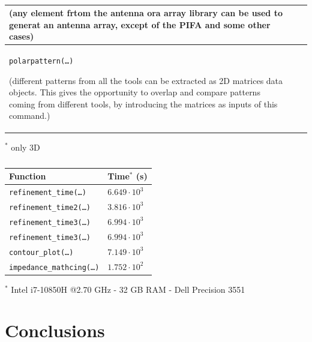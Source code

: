 \documentclass[10 pt,a4paper,twocolumn]{article}
\newcommand{\cmark}{\ding{51}}%
\newcommand{\xmark}{\ding{55}}%
\begin{document}
{\begin{table}[bt!]
\begin{center}
{\begin{tabular}{|m{15.5cm}|c|c|}
			\small{{(any element frtom the antenna ora array library can be used to generat an antenna array, except of the PIFA and some other cases)}} & \textcolor{ForestGreen}{\cmark} & \textcolor{Mahogany}{\xmark} \\
			\hline
			\colorbox{backcolour}{\texttt{polarpattern(\dots)}}
			
			\small{{(different patterns from all the tools can be extracted as 2D matrices data objects. This gives the opportunity to overlap and compare patterns coming from different tools, by introducing the matrices as inputs of this command.)}} & \textcolor{ForestGreen}{\cmark} & \cmark \\
			\hline
	\end{tabular}}
\end{center}
	\footnotesize{$^*$ only 3D}
	\caption{}
\end{table} 

\begin{table}[bt!]
	\begin{center}
		{
			\begin{tabular}{|m{5.4cm}|m{1.6cm}|}
				\hline
				\textbf{Function} & \textbf{Time$^*$} (s)  \\
			
				\hline
				\colorbox{backcolour}{\texttt{refinement\_time(\dots)}}	& $6.649\cdot 10^3$  \\
				\hline
				\colorbox{backcolour}{\texttt{refinement\_time2(\dots)}}	& $3.816\cdot 10^3$  \\
			\hline
				\colorbox{backcolour}{\texttt{refinement\_time3(\dots)}}	& $6.994\cdot 10^3$  \\
			\hline
				\colorbox{backcolour}{\texttt{refinement\_time3(\dots)}}	& $6.994\cdot 10^3$  \\
			\hline
				\colorbox{backcolour}{\texttt{contour\_plot(\dots)}}	& $7.149\cdot 10^3$  \\
			\hline
				\colorbox{backcolour}{\texttt{impedance\_mathcing(\dots)}}	& $1.752\cdot 10^2$  \\
			\hline

		\end{tabular}}
	\end{center}
	\tiny{$^*$ Intel i7-10850H @2.70 GHz - 32 GB RAM - Dell Precision 3551}
	\caption{}
\end{table} 

\section*{Conclusions}
\textcolor{blue}{\lipsum[1-3]}
}
\end{document}
